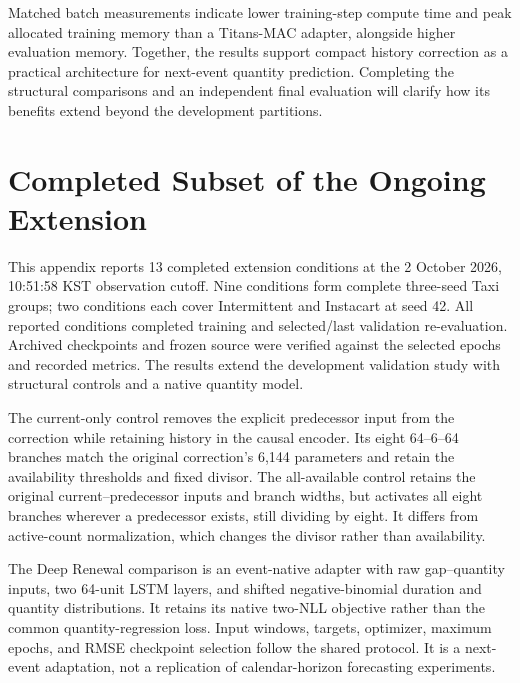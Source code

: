 \documentclass[runningheads]{llncs}
\begin{document}
Matched batch measurements indicate lower training-step compute time and
peak allocated training memory than a Titans-MAC adapter, alongside higher
evaluation memory. Together, the results support compact history correction
as a practical architecture for next-event quantity prediction. Completing
the structural comparisons and an independent final evaluation will clarify
how its benefits extend beyond the development partitions.

\appendix
\section{Completed Subset of the Ongoing Extension}\label{app:extension}
This appendix reports 13 completed extension conditions at the 2 October
2026, 10:51:58 KST observation cutoff. Nine conditions form complete
three-seed Taxi groups; two conditions each cover Intermittent and Instacart
at seed 42. All reported conditions completed training and selected/last
validation re-evaluation. Archived checkpoints and frozen source were
verified against the selected epochs and recorded metrics. The results
extend the development validation study with structural controls and a
native quantity model.

The current-only control removes the explicit predecessor input from the
correction while retaining history in the causal encoder. Its eight
64--6--64 branches match the original correction's 6,144 parameters and
retain the availability thresholds and fixed divisor. The all-available
control retains the original current--predecessor inputs and branch widths,
but activates all eight branches wherever a predecessor exists, still
dividing by eight. It differs from active-count normalization, which changes
the divisor rather than availability.

The Deep Renewal comparison is an event-native adapter with raw gap--quantity
inputs, two 64-unit LSTM layers, and shifted negative-binomial duration and
quantity distributions. It retains its native two-NLL objective rather than
the common quantity-regression loss. Input windows, targets, optimizer,
maximum epochs, and RMSE checkpoint selection follow the shared protocol.
It is a next-event adaptation, not a replication of calendar-horizon
forecasting experiments.
\end{document}
